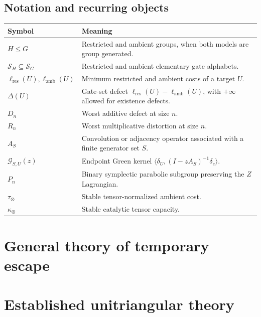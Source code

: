 \documentclass[11pt,openany]{book}
\numberwithin{equation}{chapter}
\theoremstyle{definition}
\theoremstyle{remark}
\newcommand{\ellRes}{\ell_{\mathrm{res}}}
\newcommand{\ellAmb}{\ell_{\mathrm{amb}}}
\begin{document}
\chapter*{Notation and recurring objects}
\begin{longtable}{@{}p{}p{}@{}}
\toprule
Symbol & Meaning\\
\midrule
$H\le G$ & Restricted and ambient groups, when both models are group generated.\\
$\mathcal S_H\subseteq\mathcal S_G$ & Restricted and ambient elementary gate alphabets.\\
$\ellRes(U),\ellAmb(U)$ & Minimum restricted and ambient costs of a target $U$.\\
$\Delta(U)$ & Gate-set defect $\ellRes(U)-\ellAmb(U)$, with $+\infty$ allowed for existence defects.\\
$D_n$ & Worst additive defect at size $n$.\\
$R_n$ & Worst multiplicative distortion at size $n$.\\
$A_S$ & Convolution or adjacency operator associated with a finite generator set $S$.\\
$\mathcal G_{S,U}(z)$ & Endpoint Green kernel $\langle\delta_U,(I-zA_S)^{-1}\delta_e\rangle$.\\
$P_n$ & Binary symplectic parabolic subgroup preserving the $Z$ Lagrangian.\\
$\tau_\otimes$ & Stable tensor-normalized ambient cost.\\
$\kappa_\otimes$ & Stable catalytic tensor capacity.\\
\bottomrule
\end{longtable}

\tableofcontents
\listoffigures
\begingroup
\renewcommand{\addvspace}[1]{}
\listoftables
\endgroup

\mainmatter

\part{General theory of temporary escape}





\part{Established unitriangular theory}
\end{document}
